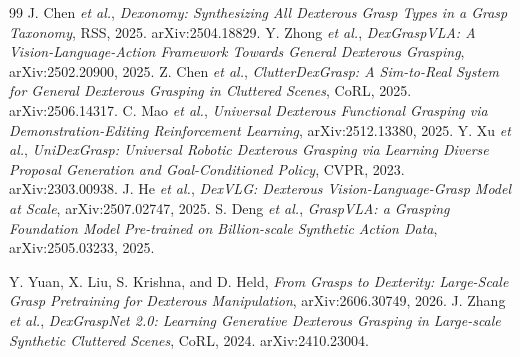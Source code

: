 \documentclass[letterpaper, 10 pt, conference]{ieeeconf}
\begin{document}
\begin{thebibliography}{99}
 J. Chen \emph{et al.},
\emph{Dexonomy: Synthesizing All Dexterous Grasp Types in a Grasp Taxonomy},
RSS, 2025. arXiv:2504.18829.
 Y. Zhong \emph{et al.},
\emph{DexGraspVLA: A Vision-Language-Action Framework Towards General Dexterous
Grasping}, arXiv:2502.20900, 2025.
 Z. Chen \emph{et al.},
\emph{ClutterDexGrasp: A Sim-to-Real System for General Dexterous Grasping in
Cluttered Scenes}, CoRL, 2025. arXiv:2506.14317.
 C. Mao \emph{et al.},
\emph{Universal Dexterous Functional Grasping via Demonstration-Editing
Reinforcement Learning}, arXiv:2512.13380, 2025.
 Y. Xu \emph{et al.},
\emph{UniDexGrasp: Universal Robotic Dexterous Grasping via Learning Diverse
Proposal Generation and Goal-Conditioned Policy}, CVPR, 2023. arXiv:2303.00938.
 J. He \emph{et al.},
\emph{DexVLG: Dexterous Vision-Language-Grasp Model at Scale},
arXiv:2507.02747, 2025.
 S. Deng \emph{et al.},
\emph{GraspVLA: a Grasping Foundation Model Pre-trained on Billion-scale
Synthetic Action Data}, arXiv:2505.03233, 2025.

 Y. Yuan, X. Liu, S. Krishna, and D. Held,
\emph{From Grasps to Dexterity: Large-Scale Grasp
Pretraining for Dexterous Manipulation}, arXiv:2606.30749, 2026.
 J. Zhang \emph{et al.},
\emph{DexGraspNet 2.0: Learning Generative Dexterous Grasping in Large-scale
Synthetic Cluttered Scenes}, CoRL, 2024. arXiv:2410.23004.
\end{thebibliography}
\end{document}
